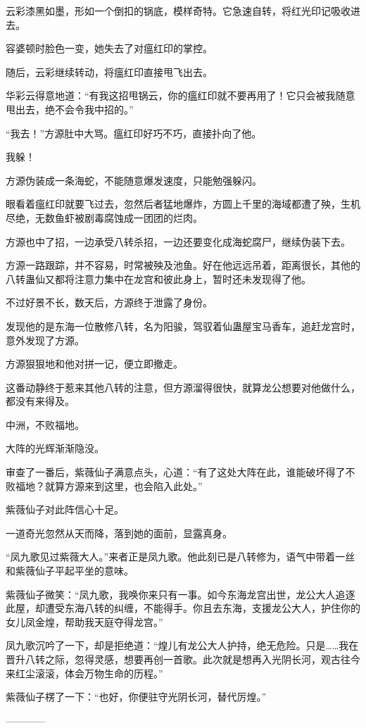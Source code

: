 \begin{this_body}
云彩漆黑如墨，形如一个倒扣的锅底，模样奇特。它急速自转，将红光印记吸收进去。

容婆顿时脸色一变，她失去了对瘟红印的掌控。

随后，云彩继续转动，将瘟红印直接甩飞出去。

华彩云得意地道：“有我这招甩锅云，你的瘟红印就不要再用了！它只会被我随意甩出去，绝不会令我中招的。”

“我去！”方源肚中大骂。瘟红印好巧不巧，直接扑向了他。

我躲！

方源伪装成一条海蛇，不能随意爆发速度，只能勉强躲闪。

眼看着瘟红印就要飞过去，忽然后者猛地爆炸，方圆上千里的海域都遭了殃，生机尽绝，无数鱼虾被剧毒腐蚀成一团团的烂肉。

方源也中了招，一边承受八转杀招，一边还要变化成海蛇腐尸，继续伪装下去。

方源一路跟踪，并不容易，时常被殃及池鱼。好在他远远吊着，距离很长，其他的八转蛊仙又都将注意力集中在龙宫和彼此身上，暂时还未发现得了他。

不过好景不长，数天后，方源终于泄露了身份。

发现他的是东海一位散修八转，名为阳骏，驾驭着仙蛊屋宝马香车，追赶龙宫时，意外发现了方源。

方源狠狠地和他对拼一记，便立即撤走。

这番动静终于惹来其他八转的注意，但方源溜得很快，就算龙公想要对他做什么，都没有来得及。

中洲，不败福地。

大阵的光辉渐渐隐没。

审查了一番后，紫薇仙子满意点头，心道：“有了这处大阵在此，谁能破坏得了不败福地？就算方源来到这里，也会陷入此处。”

紫薇仙子对此阵信心十足。

一道奇光忽然从天而降，落到她的面前，显露真身。

“凤九歌见过紫薇大人。”来者正是凤九歌。他此刻已是八转修为，语气中带着一丝和紫薇仙子平起平坐的意味。

紫薇仙子微笑：“凤九歌，我唤你来只有一事。如今东海龙宫出世，龙公大人追逐此屋，却遭受东海八转的纠缠，不能得手。你且去东海，支援龙公大人，护住你的女儿凤金煌，帮助我天庭夺得龙宫。”

凤九歌沉吟了一下，却是拒绝道：“煌儿有龙公大人护持，绝无危险。只是……我在晋升八转之际，忽得灵感，想要再创一首歌。此次就是想再入光阴长河，观古往今来红尘滚滚，体会万物生命的历程。”

紫薇仙子楞了一下：“也好，你便驻守光阴长河，替代厉煌。”

------------

\end{this_body}

